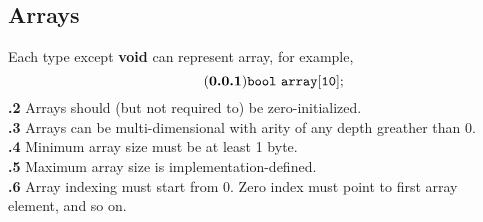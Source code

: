 \documentclass[leqno]{article}
\begin{document}
            \subsection{Arrays}
                Each type except \textbf{void} can represent array, for example,
                \begin{equation} \tag{\textbf{\thesubsection.1}}
                    \tt{bool\ array[10];}
                \end{equation}
                \textbf{\thesubsection.2} Arrays should (but not required to) be zero-initialized. \\
                \textbf{\thesubsection.3} Arrays can be multi-dimensional with arity of any depth
                greather than 0. \\
                \textbf{\thesubsection.4} Minimum array size must be at least 1 byte. \\
                \textbf{\thesubsection.5} Maximum array size is implementation-defined. \\
                \textbf{\thesubsection.6} Array indexing must start from 0. Zero index must
                point to first array element, and so on.
\end{document}
